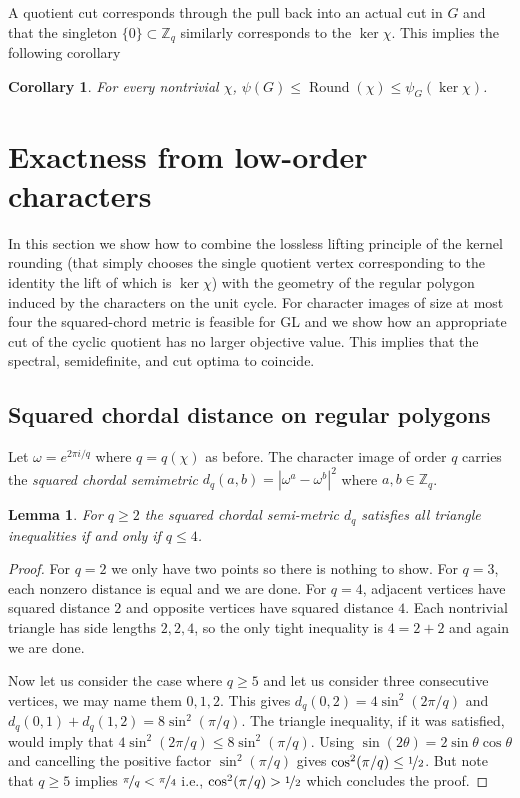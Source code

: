 \documentclass[11pt]{article}
\newtheorem{lemma}[theorem]{Lemma}
\newtheorem{corollary}[theorem]{Corollary}
\theoremstyle{definition}
\theoremstyle{remark}
\newcommand{\Z}{\mathbb{Z}}
\newcommand{\roundval}{\operatorname{Round}}
\begin{document}
A quotient cut corresponds through the pull back into an actual cut in $G$ and that the singleton $\{0\}\subset\Z_q$ similarly corresponds to the $\ker\chi$. This implies the following corollary %

\begin{corollary}
\label{cor:quotient-kernel-chain}
For every nontrivial $\chi$, $\psi(G) \leq \roundval(\chi) \leq \psi_G(\ker\chi)$.
\end{corollary}



\section{Exactness from low-order characters}\label{sec:exact}
In this section we show how to combine the lossless lifting principle of the kernel rounding (that simply chooses the single quotient vertex corresponding to the identity the lift of which is $\ker\chi$) with the geometry of the  regular polygon induced by the characters on the unit cycle. For character images of
size at most four  the squared-chord metric is feasible for GL and we show how an appropriate cut of the cyclic quotient has no larger objective value. This implies that the spectral, semidefinite, and cut optima to coincide.

\subsection{Squared chordal distance on regular polygons}

Let $\omega=e^{2\pi i/q}$ where $q = q(\chi)$ as before. The character image of order $q$ carries the \emph{squared chordal semimetric} $d_q(a,b)=|\omega^a-\omega^b|^2$ where $a,b\in\Z_q$.

\begin{lemma}
\label{lem:polygon-cutoff}
For $q \geq 2$ the squared chordal semi-metric $d_q$ satisfies all triangle inequalities if and only if $q\leq4$.
\end{lemma}

\begin{proof}
For $q=2$ we only have two points so there is nothing to show. For $q=3$, each nonzero distance is equal and we are done. For $q=4$, adjacent vertices have squared distance $2$ and opposite vertices have squared distance $4$. Each nontrivial triangle has side lengths $2,2,4$, so the only tight inequality is $4 = 2+2$ and again we are done.

Now let us consider the case where $q\geq5$ and let us consider three consecutive vertices, we may name them $0,1,2$. This gives $d_q(0,2)=4\sin^2(2\pi/q)$ and $d_q(0,1)+d_q(1,2)=8\sin^2(\pi/q)$.
The triangle inequality, if it was satisfied, would imply that $  4\sin^2(2\pi/q)\le8\sin^2(\pi/q)$. Using $\sin(2\theta)=2\sin\theta\cos\theta$ and cancelling the positive factor $\sin^2(\pi/q)$ gives $\cos^2(\pi/q) \leq \nicefrac{1}{2}$. But note that $q\geq 5$ implies $\nicefrac{\pi}{q} < \nicefrac{\pi}{4}$ i.e.,  $\cos^2(\pi/q)> \nicefrac{1}{2}$ which concludes the proof.
\end{proof}
\end{document}
